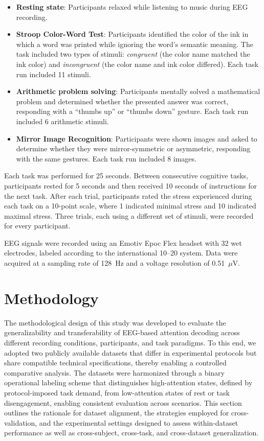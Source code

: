 \documentclass[10pt,letterpaper]{article}
\newcommand{\rev}[1]{#1}
\begin{document}
\begin{itemize}
  \item \textbf{Resting state}: Participants relaxed while listening to music during EEG recording.
  \item \textbf{Stroop Color-Word Test}: Participants identified the color of the ink in which a word was printed while ignoring the word's semantic meaning. The task included two types of stimuli: \textit{congruent} (the color name matched the ink color) and \textit{incongruent} (the color name and ink color differed). Each task run included 11 stimuli.
  \item \textbf{Arithmetic problem solving}: Participants mentally solved a mathematical problem and determined whether the presented answer was correct, responding with a ``thumbs up'' or ``thumbs down'' gesture. Each task run included 6 arithmetic stimuli.
  \item \textbf{Mirror Image Recognition}: Participants were shown images and asked to determine whether they were mirror-symmetric or asymmetric, responding with the same gestures. Each task run included 8 images.
\end{itemize}

Each task was performed for 25 seconds. Between consecutive cognitive tasks, participants rested for 5 seconds and then received 10 seconds of instructions for the next task. After each trial, participants rated the stress experienced during each task on a 10-point scale, where 1 indicated minimal stress and 10 indicated maximal stress. Three trials, each using a different set of stimuli, were recorded for every participant.

EEG signals were recorded using an Emotiv Epoc Flex headset with 32 wet electrodes, labeled according to the international 10--20 system. Data were acquired at a sampling rate of 128~Hz and a voltage resolution of 0.51~$\mu$V.

\section*{Methodology}

The methodological design of this study was developed to evaluate the generalizability and transferability of EEG-based attention decoding across different recording conditions, participants, and task paradigms. To this end, we adopted two publicly available datasets that differ in experimental protocols but share compatible technical specifications, thereby enabling a controlled comparative analysis. \rev{The datasets were harmonized through a binary operational labeling scheme that distinguishes high-attention states, defined by protocol-imposed task demand, from low-attention states of rest or task disengagement, enabling consistent evaluation across scenarios.} This section outlines the rationale for dataset alignment, the strategies employed for cross-validation, and the experimental settings designed to assess within-dataset performance as well as cross-subject, cross-task, and cross-dataset generalization.
\end{document}
